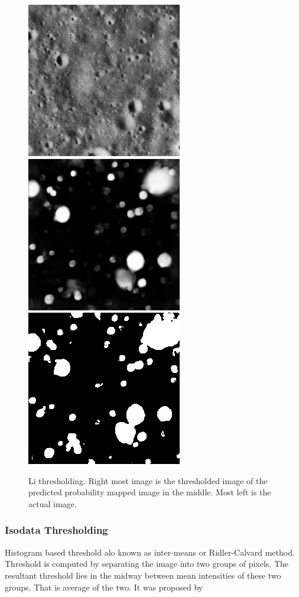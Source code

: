 \documentclass[11pt]{article}
\begin{document}
\begin{figure}[ht!]
	\includegraphics[width=.3\textwidth]{files/results/26.png}\hfill	
	\includegraphics[width=.3\textwidth]{files/results/26_predict.png}\hfill
	\includegraphics[width=.3\textwidth]{files/results/li.png}\hfill
	\caption{Li thresholding. Right most image is the thresholded image of the predicted probability mapped image in the middle. Most left is the actual image.}
	\label{Li thresholding}
\end{figure}

\subsubsection{Isodata Thresholding}
Histogram based threshold alo known as inter-means or Ridler-Calvard method. Threshold is computed by separating the image into two groups of pixels. The resultant threshold lies in the midway between mean intensities of these two groups. That is average of the two. It was proposed by \cite{ridler1978picture}
\end{document}
